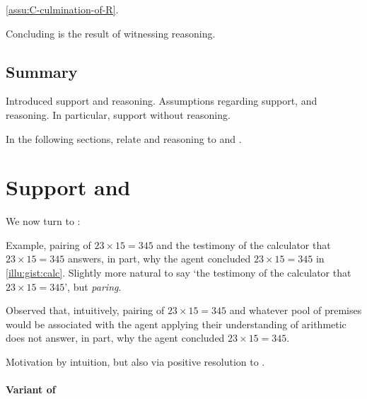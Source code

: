 \begin{note}
  \autoref{assu:C-culmination-of-R}.

  Concluding is the result of witnessing reasoning.
\end{note}


\subsection{Summary}
\label{sec:summary-1}

\begin{note}
  Introduced support and reasoning.
  Assumptions regarding support, and reasoning.
  In particular, support without reasoning.

  In the following sections, relate \support{} and reasoning to \qWhy{} and \qHow{}.
\end{note}

\section{Support and \qWhy{}}
\label{cha:clarification:sec:support-qWhy}
\label{cha:clar:expand:qWhy}

\begin{note}[Introduction]
  We now turn to \qWhy{}:
  \vspace{-\baselineskip}
  \begin{quote}
    \questionWhyBasic*
  \end{quote}
  Example, pairing of \(23 \times 15 = 345\) and the testimony of the calculator that \(23 \times 15 = 345\) answers, in part, why the agent concluded \(23 \times 15 = 345\) in \autoref{illu:gist:calc}.
  Slightly more natural to say `the testimony of the calculator that \(23 \times 15 = 345\)', but \emph{paring}.

  Observed that, intuitively, pairing of \(23 \times 15 = 345\) and whatever pool of premises would be associated with the agent applying their understanding of arithmetic does not answer, in part, why the agent concluded \(23 \times 15 = 345\).
\end{note}

\begin{note}
  Motivation by intuition, but also via positive resolution to \issueInclusion{}.
\end{note}

\paragraph{Variant of \qWhy{}}
\label{cha:clar:expand:qWhy:variant}

